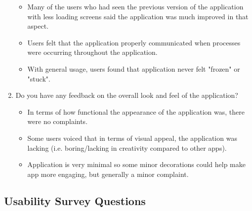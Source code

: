 \documentclass[12pt, titlepage]{article}
\begin{document}
\begin{enumerate}
\begin{itemize}
      \item Many of the users who had seen the previous version of the application with less loading screens
      said the application was much improved in that aspect.
      \item Users felt that the application properly communicated when processes were occurring throughout
      the application.
      \item With general usage, users found that application never felt "frozen" or "stuck".
    \end{itemize}
  \item Do you have any feedback on the overall look and feel of the application?
    \begin{itemize}
      \item In terms of how functional the appearance of the application was, there were no complaints.
      \item Some users voiced that in terms of visual appeal, the application was lacking (i.e. boring/lacking
      in creativity compared to other apps).
      \item Application is very minimal so some minor decorations could help make app more engaging, but generally
      a minor complaint.
    \end{itemize}
\end{enumerate}

\subsection{Usability Survey Questions}
\end{document}
